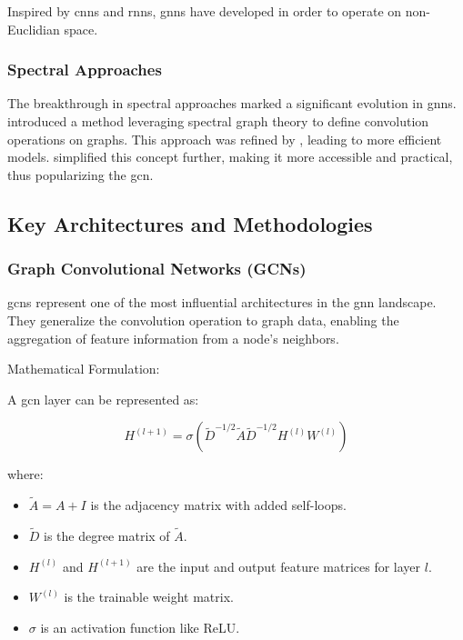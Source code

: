 Inspired by \glspl{cnn} and \glspl{rnn}, \glspl{gnn} have developed in order to operate on non-Euclidian space.

\subsubsection*{Spectral Approaches}

The breakthrough in spectral approaches marked a significant evolution in \glspl{gnn}. \cite{Bruna2013} introduced a method leveraging spectral graph theory to define convolution operations on graphs. This approach was refined by \cite{Defferrard2016}, leading to more efficient models. \cite{Kipf2017} simplified this concept further, making it more accessible and practical, thus popularizing the \gls{gcn}.

\subsection*{Key Architectures and Methodologies}

\subsubsection*{Graph Convolutional Networks (GCNs)}

\glspl{gcn} represent one of the most influential architectures in the \gls{gnn} landscape. They generalize the convolution operation to graph data, enabling the aggregation of feature information from a node's neighbors.

Mathematical Formulation:

A \gls{gcn} layer can be represented as:

\[ H^{(l+1)} = \sigma\left(\tilde{D}^{-1/2}\tilde{A}\tilde{D}^{-1/2} H^{(l)} W^{(l)}\right) \]

where:
\begin{itemize}
    \item \( \tilde{A} = A + I \) is the adjacency matrix with added self-loops.
    \item \( \tilde{D} \) is the degree matrix of \( \tilde{A} \).
    \item \( H^{(l)} \) and \( H^{(l+1)} \) are the input and output feature matrices for layer \( l \).
    \item \( W^{(l)} \) is the trainable weight matrix.
    \item \( \sigma \) is an activation function like ReLU.
\end{itemize}


